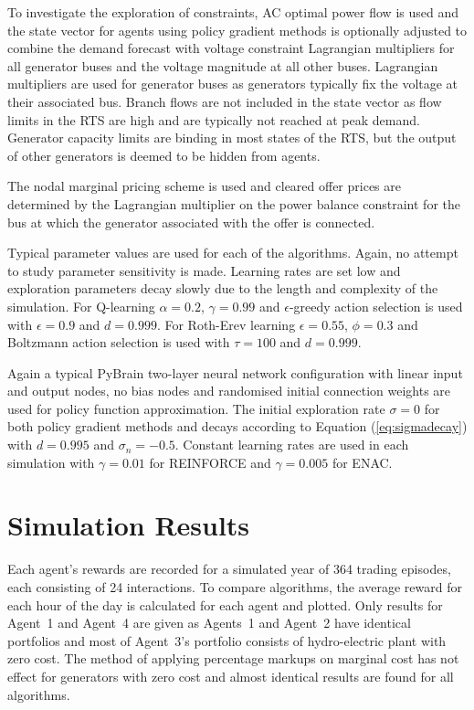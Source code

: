 To investigate the exploration of constraints, AC optimal power flow is used and
the state vector for agents using policy gradient methods is optionally adjusted
to combine the demand forecast with voltage constraint Lagrangian multipliers
for all generator buses and the voltage magnitude at all other buses.
Lagrangian multipliers are used for generator buses as generators typically fix
the voltage at their associated bus.  Branch flows are not included in the state
vector as flow limits in the RTS are high and are typically not reached at
peak demand.  Generator capacity limits are binding in most states of the RTS,
but the output of other generators is deemed to be hidden from agents.

The nodal marginal pricing scheme is used and cleared offer prices are
determined by the Lagrangian multiplier on the power balance constraint for the
bus at which the generator associated with the offer is connected.

Typical parameter values are used for each of the algorithms.  Again, no attempt
to study parameter sensitivity is made.  Learning rates are set low and
exploration parameters decay slowly due to the length and complexity of the
simulation.  For Q-learning $\alpha=0.2$, $\gamma=0.99$ and $\epsilon$-greedy
action selection is used with $\epsilon=0.9$ and $d=0.999$. For Roth-Erev
learning $\epsilon=0.55$, $\phi=0.3$ and Boltzmann action selection is used with
$\tau=100$ and $d=0.999$.

Again a typical PyBrain two-layer neural network configuration with linear input
and output nodes, no bias nodes and randomised initial connection weights are
used for policy function approximation.  The initial exploration rate $\sigma=0$
for both policy gradient methods and decays according to Equation
(\ref{eq:sigmadecay}) with $d=0.995$ and $\sigma_n=-0.5$.  Constant learning
rates are used in each simulation with $\gamma=0.01$ for REINFORCE and
$\gamma=0.005$ for ENAC.

\section{Simulation Results}
Each agent's rewards are recorded for a simulated year of 364 trading episodes,
each consisting of 24 interactions.  To compare algorithms, the average reward
for each hour of the day is calculated for each agent and plotted.  Only results
for Agent~1 and Agent~4 are given as Agents~1 and Agent~2 have identical
portfolios and most of Agent~3's portfolio consists of hydro-electric plant
with zero cost.  The method of applying percentage markups on marginal cost has not
effect for generators with zero cost and almost identical results are found for
all algorithms.

